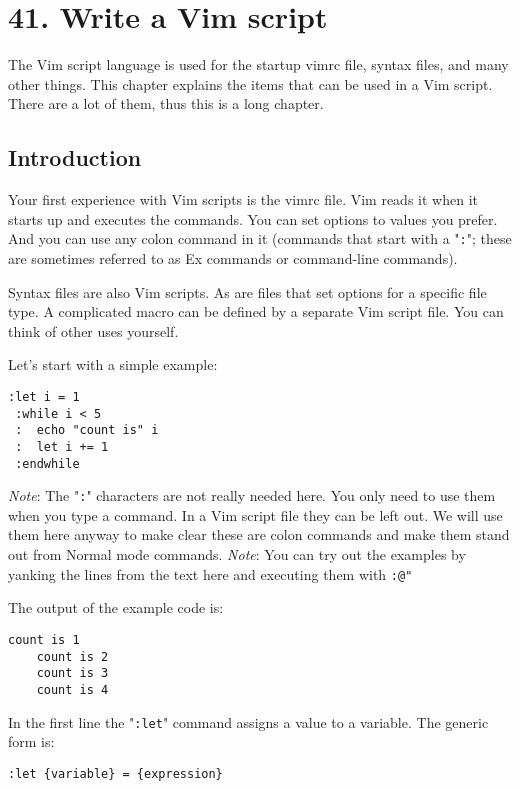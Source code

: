 \section{41. Write a Vim script}
\label{Write a Vim script}
The Vim script language is used for the startup vimrc file, syntax files, and many other things.
This chapter explains the items that can be used in a Vim script.
There are a lot of them, thus this is a long chapter.
\subsection{Introduction}
\label{vim-script-intro}
\label{script}
Your first experience with Vim scripts is the vimrc file.
Vim reads it when it starts up and executes the commands.
You can set options to values you prefer.
And you can use any colon command in it (commands that start with a "\verb!:!"; these are sometimes referred to as Ex commands or command-line commands).

Syntax files are also Vim scripts.
As are files that set options for a specific file type.
A complicated macro can be defined by a separate Vim script file.
You can think of other uses yourself.

Let's start with a simple example:

\begin{Verbatim}[samepage=true]
 :let i = 1
 :while i < 5
 :  echo "count is" i
 :  let i += 1
 :endwhile
\end{Verbatim}

\emph{Note}: The "\verb!:!" characters are not really needed here.
You only need to use them when you type a command.
In a Vim script file they can be left out.
We will use them here anyway to make clear these are colon commands and make them stand out from Normal mode commands.
\emph{Note}: You can try out the examples by yanking the lines from the text here and executing them with \verb!:@"!

The output of the example code is:

\begin{Verbatim}[samepage=true]
    count is 1
    count is 2
    count is 3
    count is 4
\end{Verbatim}

In the first line the "\verb!:let!" command assigns a value to a variable.
The generic form is:

\begin{Verbatim}[samepage=true]
 :let {variable} = {expression}
\end{Verbatim}

